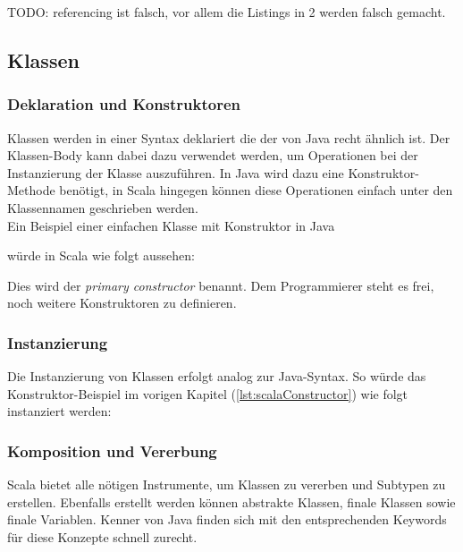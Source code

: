 TODO: referencing ist falsch, vor allem die Listings in 2 werden falsch gemacht.

\subsection{Klassen}
\label{sec:classes}

\subsubsection{Deklaration und Konstruktoren}

Klassen werden in einer Syntax deklariert die der von Java recht
ähnlich ist. Der Klassen-Body kann dabei dazu verwendet werden,
um Operationen bei der Instanzierung der Klasse auszuführen. In Java
wird dazu eine Konstruktor-Methode benötigt, in Scala hingegen können
diese Operationen einfach unter den Klassennamen geschrieben werden. \\

Ein Beispiel einer einfachen Klasse mit Konstruktor in Java


würde in Scala wie folgt aussehen:


Dies wird der \emph{primary constructor} benannt. Dem Programmierer steht es 
frei, noch weitere Konstruktoren zu definieren.


\subsubsection{Instanzierung}

Die Instanzierung von Klassen erfolgt analog zur Java-Syntax. So würde das 
Konstruktor-Beispiel im vorigen Kapitel (\ref{lst:scalaConstructor}) wie 
folgt instanziert werden:



\subsubsection{Komposition und Vererbung}

Scala bietet alle nötigen Instrumente, um Klassen zu vererben und Subtypen
zu erstellen. Ebenfalls erstellt werden können abstrakte Klassen, finale
Klassen sowie finale Variablen. Kenner von Java finden sich mit den
entsprechenden Keywords für diese Konzepte schnell zurecht.\\


